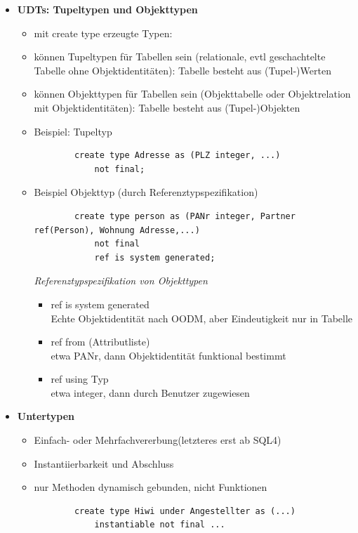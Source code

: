 \begin{itemize}
	\item \textbf{UDTs: Tupeltypen und Objekttypen}
	\begin{itemize}
		\item mit create type erzeugte Typen:
		\item können Tupeltypen für Tabellen sein (relationale, evtl geschachtelte Tabelle ohne Objektidentitäten): Tabelle besteht aus (Tupel-)Werten
		\item können Objekttypen für Tabellen sein (Objekttabelle oder Objektrelation mit Objektidentitäten): Tabelle besteht aus (Tupel-)Objekten
		\item Beispiel: Tupeltyp
		\begin{lstlisting}
		create type Adresse as (PLZ integer, ...)
			not final;
		\end{lstlisting}
		\item Beispiel Objekttyp (durch Referenztypspezifikation)
		\begin{lstlisting}
		create type person as (PANr integer, Partner ref(Person), Wohnung Adresse,...)	
			not final
			ref is system generated;
		\end{lstlisting}
		\textit{Referenztypspezifikation von Objekttypen}
		\begin{itemize}
			\item ref is system generated\\
			Echte Objektidentität nach OODM, aber Eindeutigkeit nur in Tabelle
			\item ref from (Attributliste)\\
			etwa PANr, dann Objektidentität funktional bestimmt
			\item ref using Typ\\
			etwa integer, dann durch Benutzer zugewiesen
		\end{itemize}
		
	\end{itemize}
	
	\item \textbf{Untertypen}
	\begin{itemize}
		\item Einfach- oder Mehrfachvererbung(letzteres erst ab SQL4)
		\item Instantiierbarkeit und Abschluss
		\item nur Methoden dynamisch gebunden, nicht Funktionen
		\begin{lstlisting}
		create type Hiwi under Angestellter as (...)
			instantiable not final ...
		\end{lstlisting}
	\end{itemize}
	

\end{itemize}
